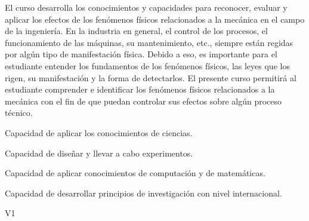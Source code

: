 \begin{syllabus}


\begin{justification}
   El curso desarrolla los conocimientos y capacidades para reconocer, evaluar y aplicar los efectos de los fenómenos físicos relacionados a la mecánica en el campo de la ingeniería. En la industria en general, el control de los procesos, el funcionamiento de las máquinas, su mantenimiento, etc., siempre están regidas por algún tipo de manifestación física. Debido a eso, es importante para el estudiante entender los fundamentos de los fenómenos físicos, las leyes que los rigen, su manifestación y la forma de detectarlos. El presente curso permitirá al estudiante comprender e identificar los fenómenos físicos relacionados a la mecánica con el fin de que puedan controlar sus efectos sobre algún proceso técnico. 
\end{justification}

\begin{goals}
\item Capacidad de aplicar los conocimientos de ciencias.
\item Capacidad de diseñar y llevar a cabo experimentos.
\item Capacidad de aplicar conocimientos de computación y de matemáticas.
\item Capacidad de desarrollar principios de investigación con nivel internacional.
\end{goals}

\begin{competences}{V1}
  \item {} 
  \item {}
  \item {}
\end{competences}


\end{syllabus}
